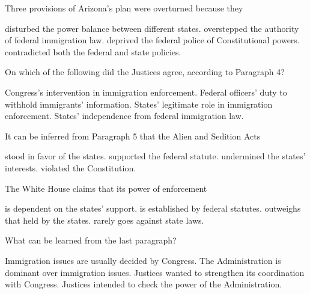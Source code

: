 \item Three provisions of Arizona's plan were overturned because they
\begin{tasks}
	\task disturbed the power balance between different states.
	\task overstepped the authority of federal immigration law.
	\task deprived the federal police of Constitutional powers.
	\task contradicted both the federal and state policies.
\end{tasks}
\item On which of the following did the Justices agree, according to Paragraph 4?
\begin{tasks}
	\task Congress's intervention in immigration enforcement.
	\task Federal officers' duty to withhold immigrants' information.
	\task States' legitimate role in immigration enforcement.
	\task States' independence from federal immigration law.
\end{tasks}
\item It can be inferred from Paragraph 5 that the Alien and Sedition Acts
\begin{tasks}
	\task stood in favor of the states.
	\task supported the federal statute.
	\task undermined the states' interests.
	\task violated the Constitution.
\end{tasks}
\item The White House claims that its power of enforcement
\begin{tasks}
	\task is dependent on the states' support.
	\task is established by federal statutes.
	\task outweighs that held by the states.
	\task rarely goes against state laws.
\end{tasks}
\item What can be learned from the last paragraph?
\begin{tasks}
	\task Immigration issues are usually decided by Congress.
	\task The Administration is dominant over immigration issues.
	\task Justices wanted to strengthen its coordination with Congress.
	\task Justices intended to check the power of the Administration.
\end{tasks}

